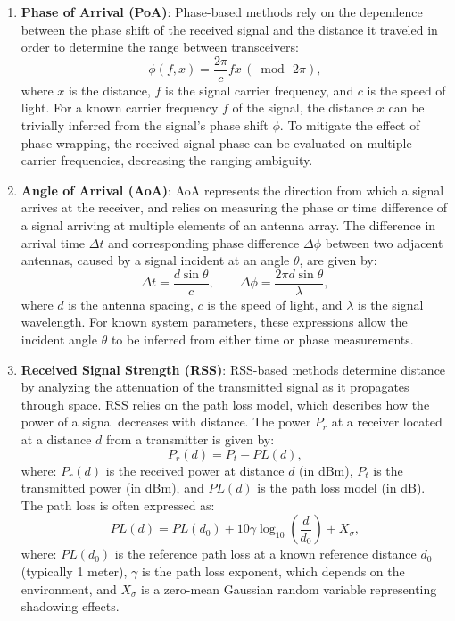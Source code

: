 \begin{enumerate}
    \item \textbf{Phase of Arrival (PoA)}: Phase-based methods rely on the dependence between the phase shift of the received signal and the distance it traveled in order to determine the range between transceivers:
    \begin{equation}
        \phi(f, x) = \frac{2\pi}{c}fx\,(\bmod\,2\pi),
    \end{equation}
    where $x$ is the distance, $f$ is the signal carrier frequency, and $c$ is the speed of light. For a known carrier frequency $f$ of the signal, the distance $x$ can be trivially inferred from the signal's phase shift $\phi$. To mitigate the effect of phase-wrapping, the received signal phase can be evaluated on multiple carrier frequencies, decreasing the ranging ambiguity. 
    
    \item \textbf{Angle of Arrival (AoA)}: AoA represents the direction from which a signal arrives at the receiver, and relies on measuring the phase or time difference of a signal arriving at multiple elements of an antenna array. The difference in arrival time $\Delta t$ and corresponding phase difference $\Delta \phi$ between two adjacent antennas, caused by a signal incident at an angle $\theta$, are given by:
    \begin{equation} 
    \Delta t = \frac{d \sin \theta}{c}, \qquad \Delta \phi = \frac{2\pi d \sin \theta}{\lambda}, 
    \end{equation}
    where $d$ is the antenna spacing, $c$ is the speed of light, and $\lambda$ is the signal wavelength. For known system parameters, these expressions allow the incident angle $\theta$ to be inferred from either time or phase measurements.
    
    \item \textbf{Received Signal Strength (RSS)}: RSS-based methods determine distance by analyzing the attenuation of the transmitted signal as it propagates through space. RSS relies on the path loss model, which describes how the power of a  signal decreases with distance. The power $P_r$ at a receiver located at a distance $d$ from a transmitter is given by:
    \begin{equation}
    P_r(d) = P_t - PL(d),
    \end{equation}
    where: $P_r(d)$ is the received power at distance $d$ (in dBm), $P_t$ is the transmitted power (in dBm), and $PL(d)$ is the path loss model (in dB). The path loss is often expressed as:
    \begin{equation}
    PL(d) = PL(d_0) + 10 \gamma \log_{10} \left( \frac{d}{d_0} \right) + X_{\sigma},
    \end{equation}
    where: $PL(d_0)$ is the reference path loss at a known reference distance $d_0$ (typically 1 meter), $\gamma$ is the path loss exponent, which depends on the environment, and $X_{\sigma}$ is a zero-mean Gaussian random variable representing shadowing effects.
    

\end{enumerate}
